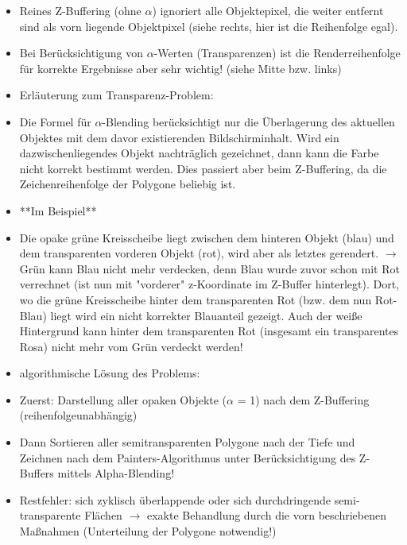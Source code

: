 \documentclass[10pt,landscape]{article}
\begin{document}
\begin{multicols}{3}

\begin{itemize}
  \item Reines Z-Buffering (ohne $\alpha$) ignoriert alle Objektepixel, die weiter entfernt sind als vorn liegende Objektpixel (siehe rechts, hier ist die Reihenfolge egal).
  \item Bei Berücksichtigung von $\alpha$-Werten (Transparenzen) ist die Renderreihenfolge für korrekte Ergebnisse aber sehr wichtig! (siehe Mitte bzw. links)
  \item Erläuterung zum Transparenz-Problem:
  \item Die Formel für $\alpha$-Blending berücksichtigt nur die Überlagerung des aktuellen Objektes mit dem davor existierenden Bildschirminhalt. Wird ein dazwischenliegendes Objekt nachträglich gezeichnet, dann kann die Farbe nicht korrekt bestimmt werden. Dies passiert aber beim Z-Buffering, da die Zeichenreihenfolge der Polygone beliebig ist.
  \item **Im Beispiel**
  \item Die opake grüne Kreisscheibe liegt zwischen dem hinteren Objekt (blau) und dem transparenten vorderen Objekt (rot), wird aber als letztes gerendert. $\rightarrow$ Grün kann Blau nicht mehr verdecken, denn Blau wurde zuvor schon mit Rot verrechnet (ist nun mit "vorderer" z-Koordinate im Z-Buffer hinterlegt). Dort, wo die grüne Kreisscheibe hinter dem transparenten Rot (bzw. dem nun Rot-Blau) liegt wird ein nicht korrekter Blauanteil gezeigt. Auch der weiße Hintergrund kann hinter dem transparenten Rot (insgesamt ein transparentes Rosa) nicht mehr vom Grün verdeckt werden!
  \item algorithmische Lösung des Problems:
  \item Zuerst: Darstellung aller opaken Objekte ($\alpha$ = 1) nach dem Z-Buffering (reihenfolgeunabhängig)
  \item Dann Sortieren aller semitransparenten Polygone nach der Tiefe und Zeichnen nach dem Painters-Algorithmus unter Berücksichtigung des Z-Buffers mittels Alpha-Blending!
  \item Restfehler: sich zyklisch überlappende oder sich durchdringende semi-transparente Flächen $\rightarrow$ exakte Behandlung durch die vorn beschriebenen Maßnahmen (Unterteilung der Polygone notwendig!)
\end{itemize}


\end{multicols}
\end{document}
